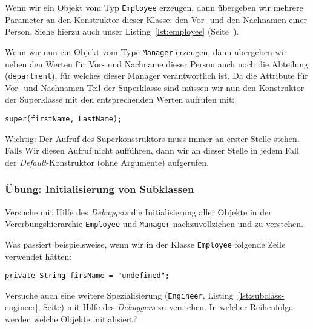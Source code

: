 Wenn wir ein Objekt vom Typ \texttt{Employee} erzeugen, dann übergeben wir mehrere Parameter
an den Konstruktor dieser Klasse: den Vor- und den Nachnamen einer Person. Siehe hierzu
auch unser Listing~\ref{lst:employee} (Seite~\pageref{lst:employee}).

Wenn wir nun ein Objekt vom Type \texttt{Manager} erzeugen, dann übergeben wir neben den
Werten für Vor- und Nachname dieser Person auch noch die Abteilung (\texttt{department}), für
welches dieser Manager verantwortlich ist. Da die Attribute für Vor- und Nachnamen Teil
der Superklasse sind müssen wir nun den Konstruktor der Superklasse mit den entsprechenden
Werten aufrufen mit:

\texttt{super(firstName, LastName);}

Wichtig: Der Aufruf des Superkonstruktors muss immer an erster Stelle stehen. Falls
Wir diesen Aufruf nicht aufführen, dann wir an dieser Stelle in jedem Fall der
\emph{Default}-Konstruktor (ohne Argumente) aufgerufen.

\begin{Exercise}[%
title={Initialisierung von Subklassen},
label={ex:init-subclasses}]

    \begin{frame}[fragile]
        \frametitle<presentation>{Übung: Initialisierung von Subklassen}
        Versuche mit Hilfe des \emph{Debuggers} die Initialisierung aller Objekte in der
        Vererbungshierarchie \texttt{Employee} und \texttt{Manager} nachzuvollziehen und
        zu verstehen.

        Was passiert beispielsweise, wenn wir in der Klasse \texttt{Employee} folgende
        Zeile verwendet hätten:

        \texttt{private String firsName = "undefined";}
    \end{frame}

    Versuche auch eine weitere Spezialisierung (\texttt{Engineer},
    Listing~\ref{lst:subclass-engineer}, Seite\pageref{lst:subclass-engineer})
    mit Hilfe des \emph{Debuggers} zu verstehen.
    In welcher Reihenfolge werden welche Objekte initialisiert?

\end{Exercise}



